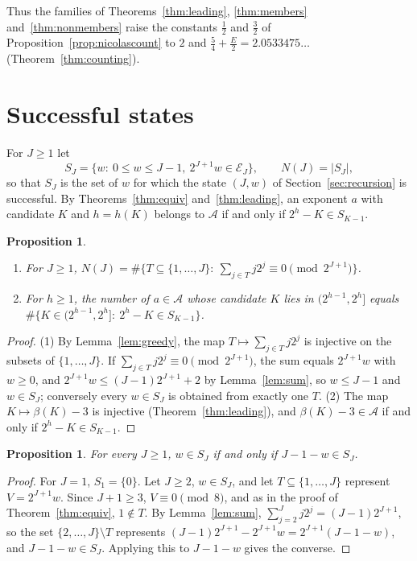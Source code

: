 \documentclass[11pt]{amsart}
\newtheorem{Proposition}[Theorem]{Proposition}
\theoremstyle{definition}
\begin{document}
Thus the families of Theorems~\ref{thm:leading}, \ref{thm:members} and~\ref{thm:nonmembers} raise the constants $\frac12$ and $\frac32$ of Proposition~\ref{prop:nicolascount} to $2$ and $\frac54+\frac E2=2.0533475\ldots$ (Theorem~\ref{thm:counting}).

\section{Successful states}
\label{sec:states}
For $J\ge1$ let
\[
S_J=\{w:\ 0\le w\le J-1,\ 2^{J+1}w\in\mathcal{E}_J\},\qquad N(J)=|S_J|,
\]
so that $S_J$ is the set of $w$ for which the state $(J,w)$ of Section~\ref{sec:recursion} is successful. By Theorems~\ref{thm:equiv} and~\ref{thm:leading}, an exponent $a$ with candidate $K$ and $h=h(K)$ belongs to $\mathcal{A}$ if and only if $2^h-K\in S_{K-1}$.

\begin{Proposition}
\label{prop:Ncount}
\begin{enumerate}
\item For $J\ge1$, $N(J)=\#\{T\subseteq\{1,\dots,J\}:\ \sum_{j\in T}j2^j\equiv0\pmod{2^{J+1}}\}$.
\item For $h\ge1$, the number of $a\in\mathcal{A}$ whose candidate $K$ lies in $(2^{h-1},2^h]$ equals $\#\{K\in(2^{h-1},2^h]:\ 2^h-K\in S_{K-1}\}$.
\end{enumerate}
\end{Proposition}
\begin{proof}
(1) By Lemma~\ref{lem:greedy}, the map $T\mapsto\sum_{j\in T}j2^j$ is injective on the subsets of $\{1,\dots,J\}$. If $\sum_{j\in T}j2^j\equiv0\pmod{2^{J+1}}$, the sum equals $2^{J+1}w$ with $w\ge0$, and $2^{J+1}w\le(J-1)2^{J+1}+2$ by Lemma~\ref{lem:sum}, so $w\le J-1$ and $w\in S_J$; conversely every $w\in S_J$ is obtained from exactly one $T$. (2) The map $K\mapsto\beta(K)-3$ is injective (Theorem~\ref{thm:leading}), and $\beta(K)-3\in\mathcal{A}$ if and only if $2^{h}-K\in S_{K-1}$.
\end{proof}

\begin{Proposition}
\label{prop:symmetry}
For every $J\ge1$, $w\in S_J$ if and only if $J-1-w\in S_J$.
\end{Proposition}
\begin{proof}
For $J=1$, $S_1=\{0\}$. Let $J\ge2$, $w\in S_J$, and let $T\subseteq\{1,\dots,J\}$ represent $V=2^{J+1}w$. Since $J+1\ge3$, $V\equiv0\pmod8$, and as in the proof of Theorem~\ref{thm:equiv}, $1\notin T$. By Lemma~\ref{lem:sum}, $\sum_{j=2}^{J}j2^j=(J-1)2^{J+1}$, so the set $\{2,\dots,J\}\setminus T$ represents $(J-1)2^{J+1}-2^{J+1}w=2^{J+1}(J-1-w)$, and $J-1-w\in S_J$. Applying this to $J-1-w$ gives the converse.
\end{proof}
\end{document}
